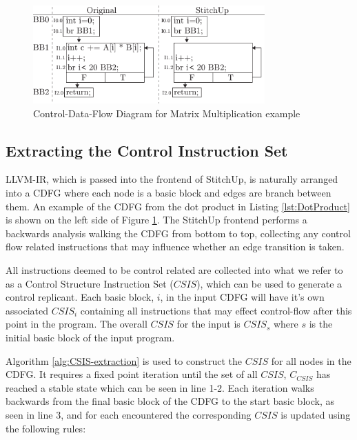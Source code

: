 \begin{figure}[t]
\centering
\includegraphics[width=3.5in]{./imgs/dot_product_cdfg.pdf}
\caption{Control-Data-Flow Diagram for Matrix Multiplication example}
\label{fig:mmm_cdfg}
\end{figure}

\subsection{Extracting the Control Instruction Set}
LLVM-IR, which is passed into the frontend of StitchUp, is naturally arranged into a CDFG
where each node is a basic block and edges are branch between them.
An example of the CDFG from the dot product in Listing \ref{lst:DotProduct}
is shown on the left side of Figure \ref{fig:mmm_cdfg}.
The StitchUp frontend performs a backwards analysis walking the CDFG from bottom to top, collecting any control flow
related instructions that may influence whether an edge transition is taken.

All instructions deemed to be control related are collected into what we refer to as a Control Structure Instruction Set ($\mathit{CSIS}$),
which can be used to generate a control replicant.
Each basic block, $i$, in the input CDFG will have it's own associated $\mathit{CSIS}_{i}$ containing all instructions that may effect
control-flow after this point in the program.
The overall $\mathit{CSIS}$ for the input is $\mathit{CSIS}_s$ where $s$ is the initial basic block of the input program.

Algorithm \ref{alg:CSIS-extraction} is used to construct the $\mathit{CSIS}$ for all nodes in the CDFG.
It requires a fixed point iteration until the set of all $\mathit{CSIS}$, $C_{\mathit{CSIS}}$ has reached a stable state
which can be seen in line 1-2.
Each iteration walks backwards from the final basic block of the CDFG to the start basic block, as seen in
line 3, and for each encountered the corresponding $\mathit{CSIS}$ is updated using the following rules:

